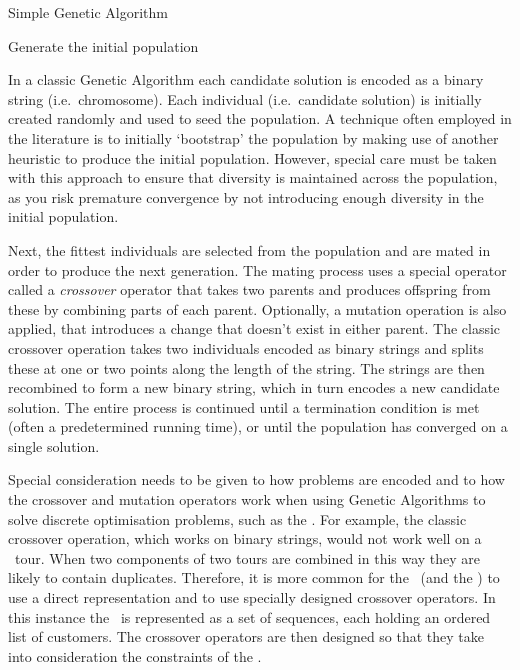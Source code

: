 \begin{algorithm}[H]
   \caption{Simple Genetic Algorithm}
   Generate the initial population\\
\end{algorithm}

In a classic Genetic Algorithm each candidate solution is encoded as a binary string (i.e.~chromosome). Each individual (i.e.~candidate solution) is initially created randomly and used to seed the population. A technique often employed in the literature is to initially `bootstrap' the population by making use of another heuristic to produce the initial population. However, special care must be taken with this approach to ensure that diversity is maintained across the population, as you risk premature convergence by not introducing enough diversity in the initial population. 

Next, the fittest individuals are selected from the population and are mated in order to produce the next generation. The mating process uses a special operator called a \emph{crossover} operator that takes two parents and produces offspring from these by combining parts of each parent. Optionally, a mutation operation is also applied, that introduces a change that doesn't exist in either parent. The classic crossover operation takes two individuals encoded as binary strings and splits these at one or two points along the length of the string. The strings are then recombined to form a new binary string, which in turn encodes a new candidate solution. The entire process is continued until a termination condition is met (often a predetermined running time), or until the population has converged on a single solution.

Special consideration needs to be given to how problems are encoded and to how the crossover and mutation operators work when using Genetic Algorithms to solve discrete optimisation problems, such as the \VRP. For example, the classic crossover operation, which works on binary strings, would not work well on a \TSP\ tour. When two components of two tours are combined in this way they are likely to contain duplicates. Therefore, it is more common for the \VRP\ (and the \TSP) to use a direct representation and to use specially designed crossover operators. In this instance the \VRP\ is represented as a set of sequences, each holding an ordered list of customers. The crossover operators are then designed so that they take into consideration the constraints of the \VRP.

